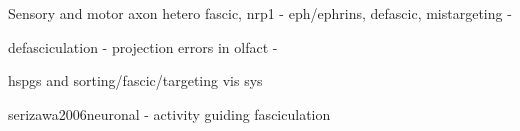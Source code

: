 
Sensory and motor axon hetero fascic, nrp1 - \cite{huber2005distinct,huettl2011npn}
eph/ephrins, defascic, mistargeting - \cite{gallarda2008segregation}

defasciculation - projection errors in olfact - \cite{cloutier2002neuropilin}

hspgs and sorting/fascic/targeting vis sys \cite{lee2004axon}

serizawa2006neuronal - activity guiding fasciculation